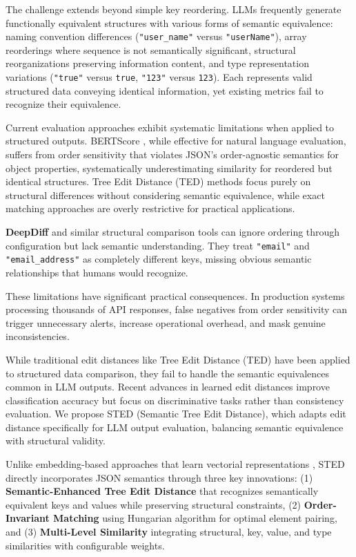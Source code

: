 \documentclass{article}
\begin{document}
The challenge extends beyond simple key reordering. LLMs frequently generate functionally equivalent structures with various forms of semantic equivalence: naming convention differences (\texttt{"user\_name"} versus \texttt{"userName"}), array reorderings where sequence is not semantically significant, structural reorganizations preserving information content, and type representation variations (\texttt{"true"} versus \texttt{true}, \texttt{"123"} versus \texttt{123}). Each represents valid structured data conveying identical information, yet existing metrics fail to recognize their equivalence.

Current evaluation approaches exhibit systematic limitations when applied to structured outputs. BERTScore \cite{Zhang2020}, while effective for natural language evaluation, suffers from order sensitivity that violates JSON's order-agnostic semantics for object properties, systematically underestimating similarity for reordered but identical structures. Tree Edit Distance (TED) methods focus purely on structural differences without considering semantic equivalence, while exact matching approaches are overly restrictive for practical applications.

\textbf{DeepDiff} \cite{seperman} and similar structural comparison tools can ignore ordering through configuration but lack semantic understanding. They treat \texttt{"email"} and \texttt{"email\_address"} as completely different keys, missing obvious semantic relationships that humans would recognize.

These limitations have significant practical consequences. In production systems processing thousands of API responses, false negatives from order sensitivity can trigger unnecessary alerts, increase operational overhead, and mask genuine inconsistencies.

While traditional edit distances like Tree Edit Distance (TED) have been applied to structured data comparison, they fail to handle the semantic equivalences common in LLM outputs. Recent advances in learned edit distances \cite{paassen2018tree} improve classification accuracy but focus on discriminative tasks rather than consistency evaluation. We propose STED (Semantic Tree Edit Distance), which adapts edit distance specifically for LLM output evaluation, balancing semantic equivalence with structural validity.

Unlike embedding-based approaches that learn vectorial representations \cite{paassen2018tree}, STED directly incorporates JSON semantics through three key innovations: (1) \textbf{Semantic-Enhanced Tree Edit Distance} that recognizes semantically equivalent keys and values while preserving structural constraints, (2) \textbf{Order-Invariant Matching} using Hungarian algorithm for optimal element pairing, and (3) \textbf{Multi-Level Similarity} integrating structural, key, value, and type similarities with configurable weights.
\end{document}
